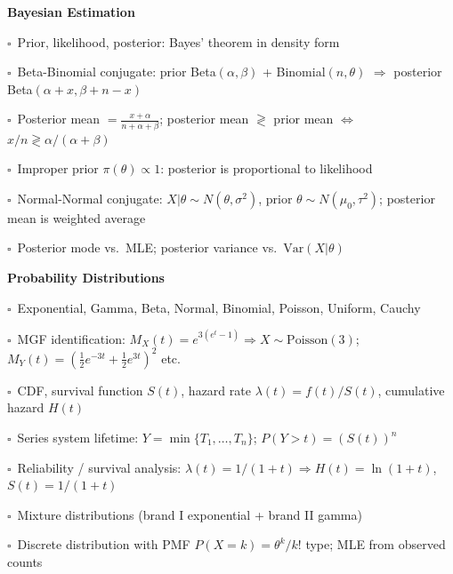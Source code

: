 \documentclass[11pt,a4paper]{article}
\newcommand{\chk}{\textcolor{rulegray}{$\square$}\ }
\begin{document}
\begin{subtopics}
  \item \textbf{Bayesian Estimation}
  \begin{subtopics}
    \item \chk Prior, likelihood, posterior: Bayes' theorem in density form
    \item \chk Beta-Binomial conjugate: prior Beta$(\alpha,\beta)$ + Binomial$(n,\theta)$ $\Rightarrow$ posterior Beta$(\alpha+x, \beta+n-x)$
    \item \chk Posterior mean $= \frac{x+\alpha}{n+\alpha+\beta}$; posterior mean $\gtrless$ prior mean $\Leftrightarrow$ $x/n \gtrless \alpha/(\alpha+\beta)$
    \item \chk Improper prior $\pi(\theta)\propto 1$: posterior is proportional to likelihood
    \item \chk Normal-Normal conjugate: $X|\theta\sim N(\theta,\sigma^2)$, prior $\theta\sim N(\mu_0,\tau^2)$; posterior mean is weighted average
    \item \chk Posterior mode vs.\ MLE; posterior variance vs.\ $\mathrm{Var}(X|\theta)$
  \end{subtopics}

  \item \textbf{Probability Distributions}
  \begin{subtopics}
    \item \chk Exponential, Gamma, Beta, Normal, Binomial, Poisson, Uniform, Cauchy
    \item \chk MGF identification: $M_X(t)=e^{3(e^t-1)} \Rightarrow X\sim\text{Poisson}(3)$; $M_Y(t)=(\tfrac{1}{2}e^{-3t}+\tfrac{1}{2}e^{3t})^2$ etc.
    \item \chk CDF, survival function $S(t)$, hazard rate $\lambda(t)=f(t)/S(t)$, cumulative hazard $H(t)$
    \item \chk Series system lifetime: $Y=\min\{T_1,\ldots,T_n\}$; $P(Y>t)=(S(t))^n$
    \item \chk Reliability / survival analysis: $\lambda(t)=1/(1+t) \Rightarrow H(t)=\ln(1+t)$, $S(t)=1/(1+t)$
    \item \chk Mixture distributions (brand I exponential + brand II gamma)
    \item \chk Discrete distribution with PMF $P(X=k)=\theta^k/k!$ type; MLE from observed counts
  \end{subtopics}


\end{subtopics}
\end{document}
